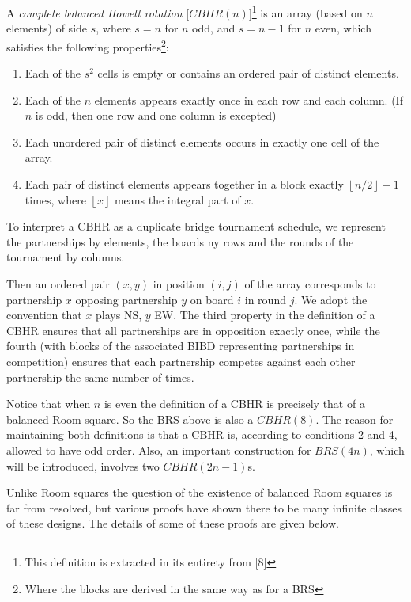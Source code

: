 \documentclass[
  11pt,
  a4paper]{book}
\begin{document}
A \emph{complete balanced Howell rotation} {[}\(CBHR(n)\){]}\footnote{This
  definition is extracted in its entirety from {[}8{]}} is an array
(based on \(n\) elements) of side \(s\), where \(s = n\) for \(n\) odd,
and \(s = n-1\) for \(n\) even, which satisfies the following
properties\footnote{Where the blocks are derived in the same way as for
  a BRS}:

\begin{enumerate}
  \item{Each of the $s^2$ cells is empty or contains an ordered
    pair of distinct elements.}
  \item{Each of the $n$ elements appears exactly once in each
    row and each column. (If $n$ is odd, then one row and
    one column is excepted)}
  \item{Each unordered pair of distinct elements occurs in
    exactly one cell of the array.}
  \item{Each pair of distinct elements appears together in a
    block exactly $\left \lfloor{n/2}\right \rfloor -1$
    times, where $\left \lfloor{x}\right \rfloor$ means the
    integral part of $x$.}
\end{enumerate}

To interpret a CBHR as a duplicate bridge tournament schedule, we
represent the partnerships by elements, the boards ny rows and the
rounds of the tournament by columns.

Then an ordered pair \((x, y)\) in position \((i, j)\) of the array
corresponds to partnership \(x\) opposing partnership \(y\) on board
\(i\) in round \(j\). We adopt the convention that \(x\) plays NS, \(y\)
EW. The third property in the definition of a CBHR ensures that all
partnerships are in opposition exactly once, while the fourth (with
blocks of the associated BIBD representing partnerships in competition)
ensures that each partnership competes against each other partnership
the same number of times.

Notice that when \(n\) is even the definition of a CBHR is precisely
that of a balanced Room square. So the BRS above is also a \(CBHR(8)\).
The reason for maintaining both definitions is that a CBHR is, according
to conditions 2 and 4, allowed to have odd order. Also, an important
construction for \(BRS(4n)\), which will be introduced, involves two
\(CBHR(2n - 1)\)s.

Unlike Room squares the question of the existence of balanced Room
squares is far from resolved, but various proofs have shown there to be
many infinite classes of these designs. The details of some of these
proofs are given below.
\end{document}
